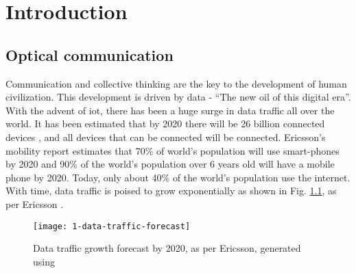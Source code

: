 \documentclass[../report.tex]{subfiles}
\begin{document}
	

	
\chapter{Introduction} 
	\section{Optical communication}
Communication and collective thinking are the key to the development of human civilization. This development is driven by data - “The new oil of this digital era”. With the advent of \gls{iot}, there has been a huge surge in data traffic all over the world. It has been estimated that by 2020 there will be 26 billion connected devices \cite{gartner_iot}, and all devices that can be connected will be connected. Ericsson's mobility report \cite{ericsson_mobility_report} estimates that 70\% of world's population will use smart-phones by 2020 and 90\% of the world's population over 6 years old will have a mobile phone by 2020. Today, only about 40\% \cite{internet_users} of the world’s population use the internet. With time, data traffic is poised to grow exponentially as shown in Fig. \ref{fig:1_data_traffic_forecast}, as per Ericsson \cite{ericsson_traffic_exploration}.

\begin{figure}[h]
	\centering
	\texttt{[image: 1-data-traffic-forecast]}
	\caption{Data traffic growth forecast by 2020, as per Ericsson, generated using \cite{ericsson_traffic_exploration, internet_minute}}
	\label{fig:1_data_traffic_forecast}
\end{figure}
\end{document}
